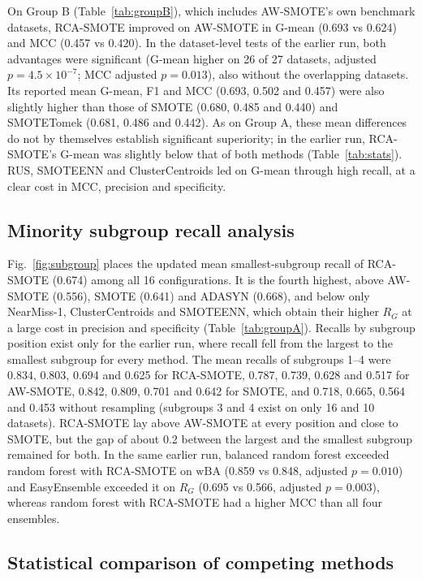 \documentclass[preprint,nopreprintline]{elsarticle}
\theoremstyle{plain}
\theoremstyle{definition}
\newcommand{\wba}{\mathrm{wBA}}
\newcommand{\rg}{R_{G}}
\begin{document}
On Group B (Table~\ref{tab:groupB}), which includes AW-SMOTE's own benchmark datasets, RCA-SMOTE improved on AW-SMOTE in G-mean (0.693 vs 0.624) and MCC (0.457 vs 0.420). In the dataset-level tests of the earlier run, both advantages were significant (G-mean higher on 26 of 27 datasets, adjusted $p=4.5\times10^{-7}$; MCC adjusted $p=0.013$), also without the overlapping datasets. Its reported mean G-mean, F1 and MCC (0.693, 0.502 and 0.457) were also slightly higher than those of SMOTE (0.680, 0.485 and 0.440) and SMOTETomek (0.681, 0.486 and 0.442). As on Group A, these mean differences do not by themselves establish significant superiority; in the earlier run, RCA-SMOTE's G-mean was slightly below that of both methods (Table~\ref{tab:stats}). RUS, SMOTEENN and ClusterCentroids led on G-mean through high recall, at a clear cost in MCC, precision and specificity.

\subsection{Minority subgroup recall analysis}\label{sec:subgroup}

Fig.~\ref{fig:subgroup} places the updated mean smallest-subgroup recall of RCA-SMOTE (0.674) among all 16 configurations. It is the fourth highest, above AW-SMOTE (0.556), SMOTE (0.641) and ADASYN (0.668), and below only NearMiss-1, ClusterCentroids and SMOTEENN, which obtain their higher $\rg$ at a large cost in precision and specificity (Table~\ref{tab:groupA}). Recalls by subgroup position exist only for the earlier run, where recall fell from the largest to the smallest subgroup for every method. The mean recalls of subgroups 1--4 were 0.834, 0.803, 0.694 and 0.625 for RCA-SMOTE, 0.787, 0.739, 0.628 and 0.517 for AW-SMOTE, 0.842, 0.809, 0.701 and 0.642 for SMOTE, and 0.718, 0.665, 0.564 and 0.453 without resampling (subgroups 3 and 4 exist on only 16 and 10 datasets). RCA-SMOTE lay above AW-SMOTE at every position and close to SMOTE, but the gap of about 0.2 between the largest and the smallest subgroup remained for both. In the same earlier run, balanced random forest exceeded random forest with RCA-SMOTE on $\wba$ (0.859 vs 0.848, adjusted $p=0.010$) and EasyEnsemble exceeded it on $\rg$ (0.695 vs 0.566, adjusted $p=0.003$), whereas random forest with RCA-SMOTE had a higher MCC than all four ensembles.

\subsection{Statistical comparison of competing methods}\label{sec:statcomp}
\end{document}
